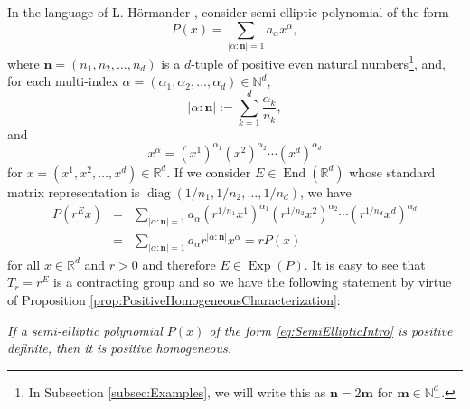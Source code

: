 \documentclass[smallextended]{svjour3}
\theoremstyle{remark}
\newcommand\End{\operatorname{End}} %
\newcommand\Exp{\operatorname{Exp}}
\newcommand\diag{\operatorname{diag}}
\begin{document}
\begin{example}\label{exp:Polynomial}\normalfont
In the language of L. H\"{o}rmander \cite{hormander_analysis_1983}, consider semi-elliptic polynomial of the form
\begin{equation}\label{eq:SemiEllipticIntro}
    P(x)=\sum_{|\alpha:\mathbf{n}|=1}a_\alpha x^\alpha,
\end{equation}
where $\mathbf{n}=(n_1,n_2,\dots,n_d)$ is a $d$-tuple of positive even natural numbers\footnote{In Subsection \ref{subsec:Examples}, we will write this as $\mathbf{n}=2\mathbf{m}$ for $\mathbf{m}\in\mathbb{N}_+^d$.}, and, for each multi-index $\alpha =(\alpha_1,\alpha_2,\dots,\alpha_d)\in\mathbb{N}^d$,
\begin{equation*}
    |\alpha:\mathbf{n}|:=\sum_{k=1}^d\frac{\alpha_k}{n_k},
\end{equation*}
and
\begin{equation*}
    x^\alpha=\left(x^1\right)^{\alpha_1}\left(x^2\right)^{\alpha_2}\cdots\left(x^d\right)^{\alpha_d}
\end{equation*}
for $x=\left(x^1,x^2,\dots,x^d\right)\in\mathbb{R}^d$. If we consider $E\in\End(\mathbb{R}^d)$ whose standard matrix representation is $\diag(1/n_1,1/n_2,\dots,1/n_d)$, we have
\begin{eqnarray*}
    P\left(r^Ex\right)
    &=&\sum_{|\alpha:\mathbf{n}|=1}a_{\alpha}\left(r^{1/n_1}x^1\right)^{\alpha_1}\left(r^{1/n_2}x^2\right)^{\alpha_2}\cdots\left(r^{1/n_d}x^d\right)^{\alpha_d}\\
    &=&\sum_{|\alpha:\mathbf{n}|=1}a_\alpha r^{|\alpha:\mathbf{n}|}x^\alpha=rP(x)
\end{eqnarray*}
for all $x\in\mathbb{R}^d$ and $r>0$ and therefore $E\in\Exp(P)$. It is easy to see that $T_r=r^E$ is a contracting group and so we have the following statement by virtue of Proposition \ref{prop:PositiveHomogeneousCharacterization}: \begin{center}\textit{If a semi-elliptic polynomial $P(x)$ of the form \eqref{eq:SemiEllipticIntro} is positive definite, then it is positive homogeneous.}
\end{center}


\end{example}
\end{document}
